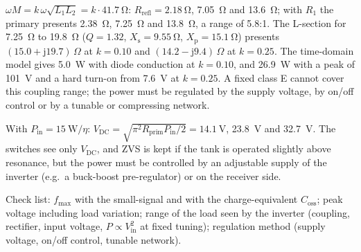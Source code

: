 \begin{solutionblock}
	$\omega M=k\,\omega\sqrt{L_1L_2}=k\cdot\SI{41.7}{\ohm}$: $R_\mathrm{refl}=\SI{2.18}{\ohm}$, \SI{7.05}{\ohm} and \SI{13.6}{\ohm}; with $R_1$ the primary presents \SI{2.38}{\ohm}, \SI{7.25}{\ohm} and \SI{13.8}{\ohm}, a range of 5.8:1.
	The L-section for \SI{7.25}{\ohm} to \SI{19.8}{\ohm} ($Q=1.32$, $X_\mathrm{s}=\SI{9.55}{\ohm}$, $X_\mathrm{p}=\SI{15.1}{\ohm}$) presents $(15.0+\mathrm{j}19.7)\,\Omega$ at $k=0.10$ and $(14.2-\mathrm{j}9.4)\,\Omega$ at $k=0.25$. The time-domain model gives \SI{5.0}{\watt} with diode conduction at $k=0.10$, and \SI{26.9}{\watt} with a peak of \SI{101}{\volt} and a hard turn-on from \SI{7.6}{\volt} at $k=0.25$. A fixed class E cannot cover this coupling range; the power must be regulated by the supply voltage, by on/off control or by a tunable or compressing network.
\end{solutionblock}


\begin{solutionblock}
	With $P_\mathrm{in}=\SI{15}{\watt}/\eta$: $V_\mathrm{DC}=\sqrt{\pi^2R_\mathrm{prim}P_\mathrm{in}/2}=\SI{14.1}{\volt}$, \SI{23.8}{\volt} and \SI{32.7}{\volt}. The switches see only $V_\mathrm{DC}$, and ZVS is kept if the tank is operated slightly above resonance, but the power must be controlled by an adjustable supply of the inverter (e.g.\ a buck-boost pre-regulator) or on the receiver side.
\end{solutionblock}




\begin{solutionblock}
	Check list: $f_\mathrm{max}$ with the small-signal and with the charge-equivalent $C_\mathrm{oss}$; peak voltage including load variation; range of the load seen by the inverter (coupling, rectifier, input voltage, $P\propto V_\mathrm{in}^2$ at fixed tuning); regulation method (supply voltage, on/off control, tunable network).
\end{solutionblock}

